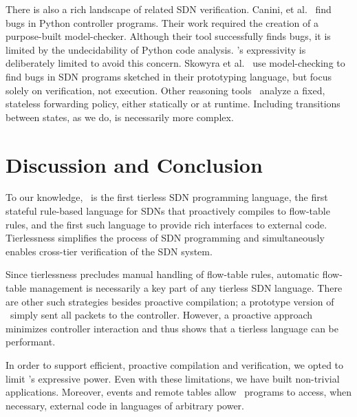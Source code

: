 
There is also a rich landscape of related SDN verification. Canini, et
al.~\cite{canini:nsdi12-nice} find bugs in Python controller
programs. Their work required the creation of a purpose-built model-checker.
Although their tool successfully finds bugs, it is limited by the
undecidability of Python code analysis. \flowlog's expressivity is
deliberately limited to avoid this concern. Skowyra et
al.~\cite{skowyra:hicons13} use model-checking to find bugs in SDN programs
sketched in their prototyping language, but focus solely on verification, not execution. Other reasoning
tools~\cite{alshaer:safeconfig10-flowchecker,gutz:hotsdn12-slices,khurshid:hotsdn12-veriflow,mai:sigcomm11-anteater,porras:hotsdn12-fortnox,xie:infocom2005-reachability}
analyze a fixed, stateless forwarding policy, either statically or at runtime.
Including transitions between states, as we do, is necessarily more complex.

\section{Discussion and Conclusion}
\label{sec:discussion}

To our knowledge, \flowlog\ is the first tierless SDN programming language,
the first stateful rule-based language for SDNs that proactively compiles to
flow-table rules, and the first such language to provide rich interfaces to
external code. Tierlessness simplifies the process of SDN programming and
simultaneously enables cross-tier verification of the SDN system.

Since tierlessness precludes manual handling of flow-table rules, automatic
flow-table management is necessarily a key part of any tierless SDN language.
There are other such strategies besides proactive compilation; a prototype
version of \flowlog\ simply sent all packets to the controller. However, a
proactive approach minimizes controller interaction and thus shows that a
tierless language can be performant.

In order to support efficient, proactive compilation and verification, we opted
to limit \flowlog's expressive power. Even with these limitations, we have built non-trivial
applications. Moreover, events and remote tables
allow \flowlog\ programs to access, when necessary, external code in languages
of arbitrary power.

%

